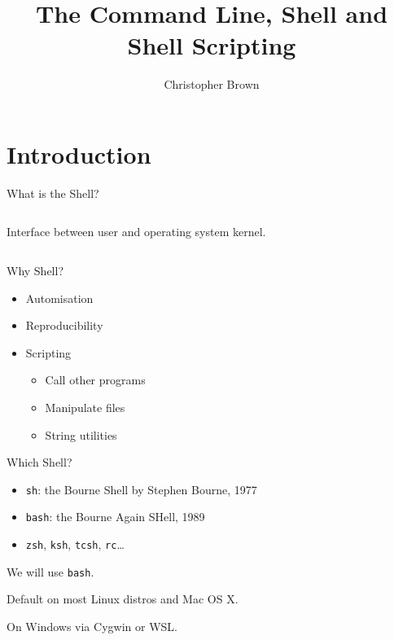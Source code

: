 \documentclass[pdf,usenames,dvipsnames,14pt]{beamer}%
\title[Command Line \& Shell]{The Command Line, Shell and Shell Scripting}
\author{Christopher Brown}
\date{}
\begin{document}
\lstset{aboveskip=0pt, belowskip=0pt} %

\begin{frame}
	\titlepage
\end{frame}

\section{Introduction}

\begin{frame}{What is the Shell?}
	\begin{columns}[t]
		Interface between user and operating system kernel.
	\end{columns}
\end{frame}

\begin{frame}{Why Shell?}
	\begin{itemize}
		\item Automisation
		\item Reproducibility
		\item Scripting
		\begin{itemize}
			\item Call other programs
			\item Manipulate files
			\item String utilities
		\end{itemize}
	\end{itemize}
\end{frame}

\begin{frame}{Which Shell?}
	\begin{itemize}
		\item \texttt{sh}: the Bourne Shell by Stephen Bourne, 1977
		\item \texttt{bash}: the Bourne Again SHell, 1989
		\item \texttt{zsh}, \texttt{ksh}, \texttt{tcsh}, \texttt{rc}\dots
	\end{itemize}
	We will use \texttt{bash}.
	
	Default on most Linux distros and Mac OS X.
	
	On Windows via Cygwin or WSL.
\end{frame}
\end{document}
